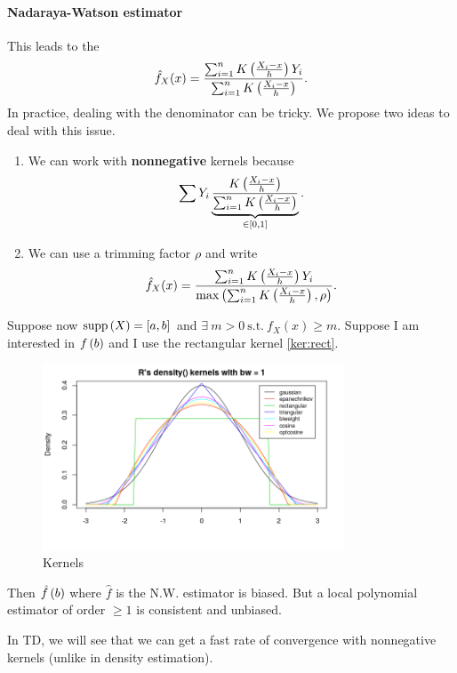 \paragraph{Nadaraya-Watson estimator} This leads to the $$\hat{f}_X(x) = \frac{\sum_{i=1}^n K\left(\frac{X_i-x}{h}\right)Y_i}{\sum_{i=1}^n K\left(\frac{X_i-x}{h}\right)}.$$
In practice, dealing with the denominator can be tricky. We propose two ideas to deal with this issue.
\begin{enumerate}
    \item We can work with \textbf{nonnegative} kernels because \begin{equation*}
        \sum Y_i \underbrace{\frac{K\left(\frac{X_i-x}{h}\right)}{\sum_{i=1}^n K\left(\frac{X_i-x}{h}\right)}}_{\in \left[0,1\right]}.
    \end{equation*}
    \item We can use a trimming factor $\rho$ and write $$\hat{f}_X(x) = \frac{\sum_{i=1}^n K\left(\frac{X_i-x}{h}\right)Y_i}{\max\left(\sum_{i=1}^n K\left(\frac{X_i-x}{h}\right),\rho\right)}.$$
\end{enumerate}
Suppose now $\text{supp}\left(X\right)=[a,b]$ and $\exists\ m>0\ \text{s.t.}\ f_X(x)\ge m$. Suppose I am interested in $f\left(b\right)$ and I use the rectangular kernel \ref{ker:rect}. 
\begin{figure}[!h]
    \centering
    \includegraphics[width=0.8\textwidth]{figures/kernels.png}
    \caption{Kernels}
\end{figure}
Then $\hat{f}\left(b\right)$ where $\hat{f}$ is the N.W. estimator is biased. But a local polynomial estimator of order $\ge 1$ is consistent and unbiased.
\begin{remark}
    In TD, we will see that we can get a fast rate of convergence with nonnegative kernels (unlike in density estimation).
\end{remark}